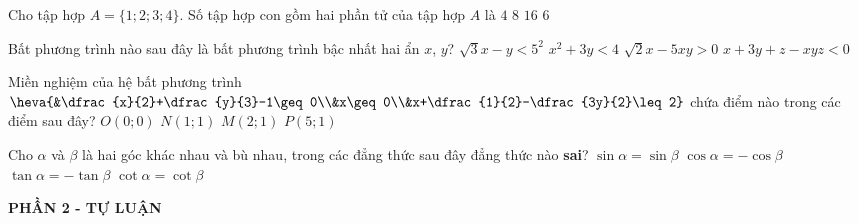 \begin{ex}%
	Cho tập hợp $A=\{1;2;3;4\}$. Số tập hợp con gồm hai phần tử của tập hợp $A$ là
	\choice
	{$4$}
	{$8$}
	{$16$}
	{\True $6$}
\end{ex}
\begin{ex}%
	Bất phương trình nào sau đây là bất phương trình bậc nhất hai ẩn $x$, $y$?
	\choice
	{\True $\sqrt{3}x-y<5^2$}
	{$x^2+3y<4$}
	{$\sqrt{2}x-5xy>0$}
	{$x+3y+z-xyz<0$}
\end{ex}

\begin{ex}%
	Miền nghiệm của hệ bất phương trình $\heva{&\dfrac{x}{2}+\dfrac{y}{3}-1\geq 0\\&x\geq 0\\&x+\dfrac{1}{2}-\dfrac{3y}{2}\leq 2}$ chứa điểm nào trong các điểm sau đây?
	\choice
	{$O(0;0)$}
	{$N(1;1)$}
	{\True $M(2;1)$}
	{$P(5;1)$}
\end{ex}

\begin{ex}%
	Cho $\alpha$ và $\beta$ là hai góc khác nhau và bù nhau, trong các đẳng thức sau đây đẳng thức nào \textbf{sai}?
	\choice
	{$\sin\alpha=\sin\beta$}
	{$\cos\alpha=-\cos\beta$}
	{$\tan\alpha=-\tan\beta$}
	{\True $\cot\alpha=\cot\beta$}
\end{ex}


\begin{center}
	\textbf{PHẦN 2 - TỰ LUẬN}
\end{center}

